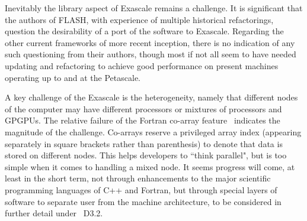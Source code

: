 Inevitably the library aspect of Exascale remains a challenge. It is significant
that the authors of FLASH, with experience of multiple historical refactorings,
question the desirability of a port of the software to Exascale.
Regarding the other current frameworks of more recent inception, there is
no indication of any such questioning from their authors, though 
most if not all seem to have needed updating and refactoring to achieve good performance
on present machines operating up to and at the Petascale.

A key challenge of the Exascale is the heterogeneity, namely that different
nodes of the computer may have different processors or mixtures of
processors and GPGPUs. 
The relative failure of the Fortran co-array feature~\cite{numrich} indicates the magnitude
of the challenge. Co-arrays reserve a privileged array index (appearing 
separately in square brackets rather than parenthesis) to denote that data is stored 
on different nodes. This helps developers to ``think parallel", but is 
too simple when it comes to handling a mixed node. It seems progress will
come, at least in the short term, not through enhancements to the major
scientific
programming languages of C++ and Fortran, but through special layers
of software to separate user from the machine architecture, to be
considered in further detail under \nep\ D3.2.

